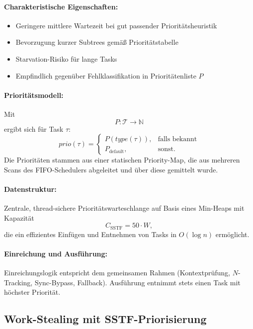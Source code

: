 \begin{sloppypar}
\paragraph{Charakteristische Eigenschaften:}
\begin{itemize}
\item Geringere mittlere Wartezeit bei gut passender Prioritätsheuristik
\item Bevorzugung kurzer Subtrees gemäß Prioritätstabelle
\item Starvation-Risiko für lange Tasks
\item Empfindlich gegenüber Fehlklassifikation in Prioritätenliste $P$
\end{itemize}

\paragraph{Prioritätsmodell:}
Mit
\[
P:\mathcal{T}\rightarrow \mathbb{N}
\]
ergibt sich für Task $\tau$:
\[
prio(\tau)=
\begin{cases}
P(type(\tau)), & \text{falls bekannt}\\
P_{\mathrm{default}}, & \text{sonst}.
\end{cases}
\]
Die Prioritäten stammen aus einer statischen Priority-Map, die aus mehreren Scans des \acs{FIFO}-Schedulers abgeleitet und über diese gemittelt wurde.

\paragraph{Datenstruktur:}
Zentrale, thread-sichere Prioritätswarteschlange auf Basis eines Min-Heaps mit Kapazität
\[
C_{\mathrm{SSTF}}=50\cdot W,
\]
die ein effizientes Einfügen und Entnehmen von Tasks in $O(\log n)$ ermöglicht.

\paragraph{Einreichung und Ausführung:}
Einreichungslogik entspricht dem gemeinsamen Rahmen (Kontextprüfung, $N$-Tracking, Sync-Bypass, Fallback).
Ausführung entnimmt stets einen Task mit höchster Priorität.

\subsection{Work-Stealing mit \acs{SSTF}-Priorisierung}


\end{sloppypar}
